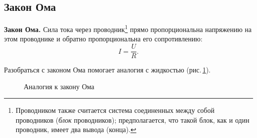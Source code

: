 \documentclass[main.tex]{subfiles}
\begin{document}

\pagestyle{empty}

\begin{NoHyper} %

\setcounter{section}{19
}
\addtocounter{section}{-1} 

\section{Закон Ома}



\begin{law}
    \textbf{Закон Ома.} Сила тока через проводник\footnote{Проводником также считается система соединенных между собой проводников (\emph{блок} проводников); предполагается, что такой блок, как и один проводник, имеет два вывода (конца).} прямо пропорциональна напряжению на этом проводнике и обратно пропорциональна его сопротивлению:
    \begin{equation}
        I=\frac{U}{R}.
    \end{equation}
\end{law}
%
Разобраться с законом Ома помогает аналогия с жидкостью (рис.\,\ref{fig:p122}).

\begin{figure}[H]
    \centering

\caption{Аналогия к закону Ома}
\label{fig:p122}
\end{figure}


\end{NoHyper}
\end{document}
